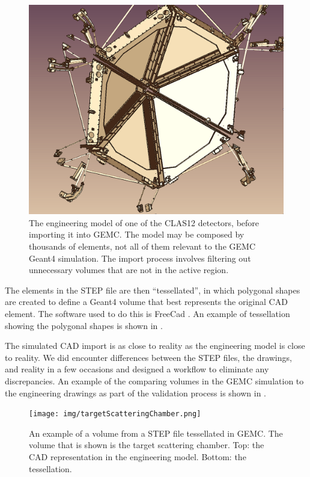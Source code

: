 \begin{figure}[h]
	\centering
	\includegraphics[width=1.0\columnwidth,keepaspectratio]{img/cadSelection.png}
	\caption{The engineering model of one of the CLAS12 detectors, before importing it into GEMC.
             The model may be composed by thousands of elements, not all of them relevant to the GEMC Geant4 simulation.
             The import process involves filtering out unnecessary volumes that are not in the active region.}
	\label{fig:cadSelection}
\end{figure}

The elements in the STEP file are then ``tessellated'', in which polygonal shapes are created to define a Geant4 volume
that best represents the original CAD element.
The software used to do this is FreeCad \cite{freeCad}. An example of tessellation showing the polygonal shapes
is shown in .

The simulated CAD import is as close to reality as the engineering model is close to reality.
We did encounter differences between the STEP files, the drawings, and reality in a few occasions and designed
a workflow to eliminate any discrepancies.
An example of the comparing volumes in the GEMC simulation to the engineering drawings
as part of the validation process is shown in .

\begin{figure}
	\centering
	\texttt{[image: img/targetScatteringChamber.png]}
	\caption{An example of a volume from a STEP file tessellated in GEMC. The volume that is shown is the target scattering chamber.
            Top: the CAD representation in the engineering model. Bottom: the tessellation. }
	\label{fig:targetScatteringChamber}
\end{figure}


